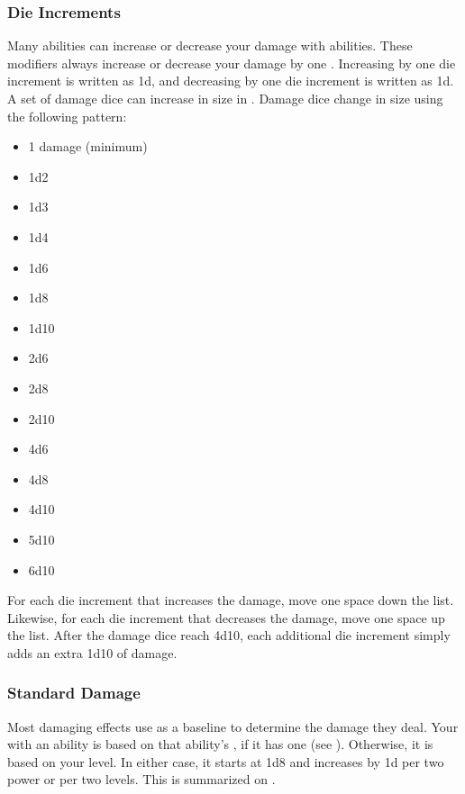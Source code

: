         \subsubsection{Die Increments}\label{Die Increments}
            Many abilities can increase or decrease your damage with abilities.
            These modifiers always increase or decrease your damage by one .
            Increasing by one die increment is written as \plus1d, and decreasing by one die increment is written as \minus1d.
            A set of damage dice can increase in size in .
            Damage dice change in size using the following pattern:
            \begin{itemize}
                \item 1 damage (minimum)
                \item 1d2
                \item 1d3
                \item 1d4
                \item 1d6
                \item 1d8
                \item 1d10
                \item 2d6
                \item 2d8
                \item 2d10
                \item 4d6
                \item 4d8
                \item 4d10
                \item 5d10
                \item 6d10
            \end{itemize}

            For each die increment that increases the damage, move one space down the list.
            Likewise, for each die increment that decreases the damage, move one space up the list.
            After the damage dice reach 4d10, each additional die increment simply adds an extra 1d10 of damage.

        \subsubsection{Standard Damage}\label{Standard Damage}
            Most damaging effects use  as a baseline to determine the damage they deal.
            Your  with an ability is based on that ability's , if it has one (see ).
            Otherwise, it is based on your level.
            In either case, it starts at 1d8 and increases by \plus1d per two power or per two levels.
            This is summarized on .


